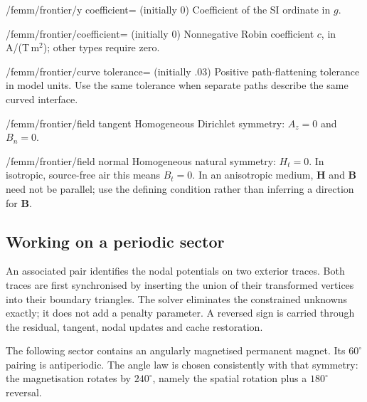 \begin{key}{/femm/frontier/y coefficient= (initially 0)}
Coefficient of the SI ordinate in $g$.
\end{key}
\begin{key}{/femm/frontier/coefficient= (initially 0)}
Nonnegative Robin coefficient $c$, in A/(T\,m$^2$); other types require zero.
\end{key}
\begin{key}{/femm/frontier/curve tolerance= (initially .03)}
Positive path-flattening tolerance in model units. Use the same tolerance when
separate paths describe the same curved interface.
\end{key}
\begin{stylekey}{/femm/frontier/field tangent}
Homogeneous Dirichlet symmetry: $A_z=0$ and $B_n=0$.
\end{stylekey}
\begin{stylekey}{/femm/frontier/field normal}
Homogeneous natural symmetry: $H_t=0$. In isotropic, source-free air this means
$B_t=0$. In an anisotropic medium, $\mathbf H$ and $\mathbf B$ need not be parallel;
use the defining condition rather than inferring a direction for $\mathbf B$.
\end{stylekey}

\subsection{Working on a periodic sector}
An associated pair identifies the nodal potentials on two exterior traces.
Both traces are first synchronised by inserting the union of their transformed
vertices into their boundary triangles. The solver eliminates the constrained
unknowns exactly; it does not add a penalty parameter. A reversed sign is carried
through the residual, tangent, nodal updates and cache restoration.

The following sector contains an angularly magnetised permanent magnet. Its
$60^\circ$ pairing is antiperiodic. The angle law is chosen consistently with
that symmetry: the magnetisation rotates by $240^\circ$, namely the spatial
rotation plus a $180^\circ$ reversal.

